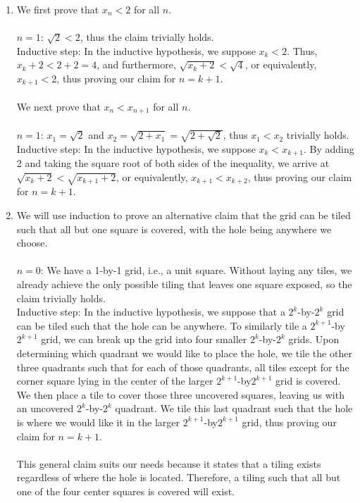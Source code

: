 \documentclass{article}
\begin{document}
\begin{enumerate}
\item We first prove that $x_n < 2$ for all $n$.\\\\
$n = 1$: $\sqrt{2} < 2$, thus the claim trivially holds.\\
Inductive step: In the inductive hypothesis, we suppose $x_k < 2$. Thus, $x_k + 2 < 2 + 2 = 4$, and furthermore, $\sqrt{x_k + 2} < \sqrt{4}$, or equivalently, $x_{k + 1} < 2$, thus proving our claim for $n = k + 1$.\\\\
We next prove that $x_n < x_{n+1}$ for all $n$.\\\\
$n = 1$: $x_1 = \sqrt{2}$ and $x_2 = \sqrt{2 + x_1} = \sqrt{2 + \sqrt{2}}$, thus $x_1 < x_2$ trivially holds.\\
Inductive step: In the inductive hypothesis, we suppose $x_k < x_{k + 1}$. By adding 2 and taking the square root of both sides of the inequality, we arrive at $\sqrt{x_k + 2} < \sqrt{x_{k + 1} + 2}$, or equivalently, $x_{k + 1} < x_{k + 2}$, thus proving our claim for $n = k + 1$.

\item We will use induction to prove an alternative claim that the grid can be tiled such that all but one square is covered, with the hole being anywhere we choose.\\\\
$n = 0$: We have a 1-by-1 grid, i.e., a unit square. Without laying any tiles, we already achieve the only possible tiling that leaves one square exposed, so the claim trivially holds.\\
Inductive step: In the inductive hypothesis, we suppose that a $2^k$-by-$2^k$ grid can be tiled such that the hole can be anywhere. To similarly tile a $2^{k + 1}$-by$2^{k + 1}$ grid, we can break up the grid into four smaller $2^k$-by-$2^k$ grids. Upon determining which quadrant we would like to place the hole, we tile the other three quadrants such that for each of those quadrants, all tiles except for the corner square lying in the center of the larger $2^{k + 1}$-by$2^{k + 1}$ grid is covered. We then place a tile to cover those three uncovered squares, leaving us with an uncovered $2^k$-by-$2^k$ quadrant. We tile this last quadrant such that the hole is where we would like it in the larger $2^{k + 1}$-by$2^{k + 1}$ grid, thus proving our claim for $n = k + 1$.\\\\
This general claim suits our needs because it states that a tiling exists regardless of where the hole is located. Therefore, a tiling such that all but one of the four center squares is covered will exist.


\end{enumerate}
\end{document}
